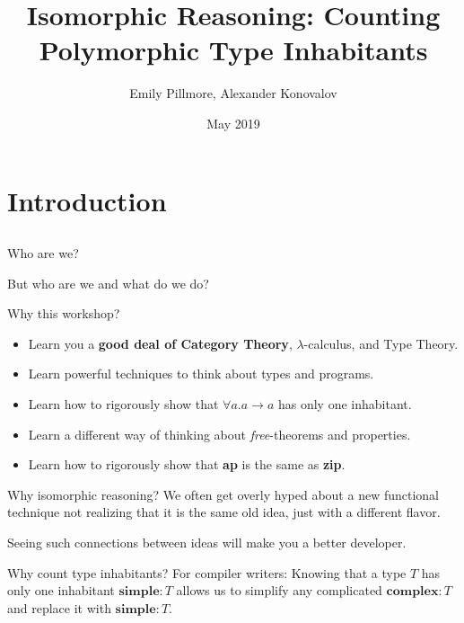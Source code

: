\documentclass[tikz]{beamer}
\title{Isomorphic Reasoning: Counting Polymorphic Type Inhabitants}
\author{Emily Pillmore, Alexander Konovalov}
\date{May 2019}
\theoremstyle{definition}
\begin{document}
\maketitle

\section{Introduction}
\subsection{}

\begin{frame}{Who are we?}

But who are we and what do we do?

\end{frame}

\begin{frame}{Why this workshop?}
\begin{itemize}
    \item Learn you a \textbf{good deal of Category Theory}, $\lambda$-calculus, and Type Theory.
    \item Learn powerful techniques to think about types and programs.
    \item Learn how to rigorously show that $\forall a. a \rightarrow a$ has only one inhabitant.
    \item Learn a different way of thinking about \textit{free}-theorems and properties.
    \item Learn how to rigorously show that \textbf{ap} is the same as \textbf{zip}.
\end{itemize}
\end{frame}

\begin{frame}{Why isomorphic reasoning?}
We often get overly hyped about a new functional technique not realizing that it is the same old idea, just with a different flavor. 

Seeing such connections between ideas will make you a better developer.
\end{frame}

\begin{frame}{Why count type inhabitants?}
For compiler writers: Knowing that a type $T$ has only one inhabitant $\textbf{simple} : T$ allows us to simplify any complicated $\textbf{complex} : T$ and replace it with $\textbf{simple} : T$.
\end{frame}
\end{document}
